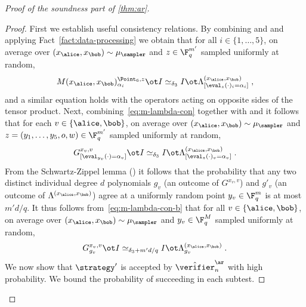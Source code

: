 \begin{proof}[Proof of the soundness part of \cref{thm:ar}]
\begin{proof}
  First we establish useful consistency relations.
  By combining  and  and applying
  Fact~\ref{fact:data-processing} we obtain that for all $i\in \{1,\ldots,5\}$,
  on average over $({x}_\alice, {x}_\bob) \sim \mu_{\sampler}$ and $z\in
  \F_q^{m'}$ sampled uniformly at random,
  \begin{equation}
    \label{eq:m-lambda-con}
    M({x}_\alice, {x}_\bob)^{\Point_6, z}_{\alpha_i} \ot I
    \simeq_{\delta_3} I \ot  \Lambda^{({x}_\alice, {x}_\bob)}_{[\eval_z(\cdot)_i =
      \alpha_i]}\;,
  \end{equation}
	and a similar equation holds with the operators acting on opposite sides of
  the tensor product.
  Next, combining~\eqref{eq:m-lambda-con} together with
   and  it follows that for
  each $v \in \{\alice,\bob\}$, on average over $({x}_\alice, {x}_\bob) \sim
  \mu_{\sampler}$ and $z=(y_1,\ldots,y_5,o,w) \in \F_q^{m'}$ sampled uniformly
  at random,
  \begin{equation}\label{eq:m-lambda-con-b}
    G^{{x}_v, v}_{[\eval_{y_v}(\cdot) = \alpha_v]} \ot I \simeq_{\delta_3} I \ot
    \Lambda^{({x}_\alice, {x}_\bob)}_{[\eval_z(\cdot)_v = \alpha_v]}\;.
  \end{equation}
  From the Schwartz-Zippel lemma () it follows that
  the probability that any two distinct individual degree $d$ polynomials $g_v$
  (an outcome of $G^{{x}_v, v}$) and $g'_v$ (an outcome of
  $\Lambda^{({x}_\alice, {x}_\bob)}$) agree at a uniformly random point $y_v\in
  \F_q^m$ is at most $m'd/q$.
  It thus follows from~\eqref{eq:m-lambda-con-b} that for all
  $v\in\{\alice,\bob\}$, on average over $({x}_\alice, {x}_\bob) \sim
  \mu_{\sampler}$ and $y_v \in\F_q^M$ sampled uniformly at random,
  \begin{equation}
    \label{eq:ld-strat-con-def}
    G^{{x}_v, v}_{g_v} \ot I \simeq_{\delta_3+m'd/q} I \ot \Lambda^{({x}_\alice,
      x_\bob)}_{g_v}\;.
  \end{equation}
  We now show that $\strategy'$ is accepted by $\tvans_n$ with high
  probability.
  We bound the probability of succeeding in each subtest.


\end{proof}
\end{proof}
